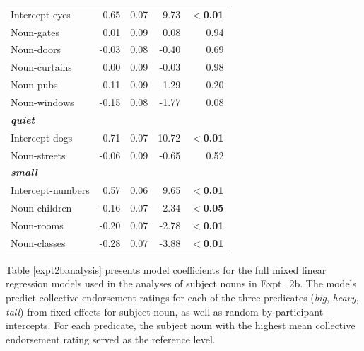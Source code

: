 \documentclass[linguex]{sp}
\begin{document}
\begin{table}[htb]
\begin{tabular}{lrrrr}
Intercept-eyes	& 	0.65	&	0.07	&	9.73	&	\textbf{$<$0.01} \\
Noun-gates	&	0.01	&   0.09	&	0.08	&	0.94 \\
Noun-doors	&	-0.03	&   0.08	&	-0.40	&	0.69 \\
Noun-curtains	&	0.00	&   0.09	&	-0.03	&	0.98 \\
Noun-pubs	&	-0.11	&   0.09 	&	-1.29	&	0.20 \\
Noun-windows	&	-0.15	&   0.08	&	-1.77	&	0.08 \\\hline
\emph{\textbf{quiet}}\\
Intercept-dogs	& 	0.71	&	0.07	&	10.72	&	\textbf{$<$0.01} \\
Noun-streets	&	-0.06	&   0.09	&	-0.65	&	0.52 \\\hline
\emph{\textbf{small}}\\
Intercept-numbers	& 	0.57	&	0.06	&	9.65	&	\textbf{$<$0.01} \\
Noun-children	&	-0.16	&   0.07	&	-2.34	&	\textbf{$<$0.05} \\
Noun-rooms	&	-0.20	&   0.07	&	-2.78	&	\textbf{$<$0.01} \\
Noun-classes	&	-0.28	&   0.07	&	-3.88	&	\textbf{$<$0.01} \\
\bottomrule
\end{tabular}
\end{table}

Table \ref{expt2banalysis} presents model coefficients for the full mixed linear regression models used in the analyses of subject nouns in Expt.~2b. The models predict collective endorsement ratings for each of the three predicates (\emph{big}, \emph{heavy}, \emph{tall}) from fixed effects for subject noun, as well as random by-participant intercepts. For each predicate, the subject noun with the highest mean collective endorsement rating served as the reference level.
\end{document}

